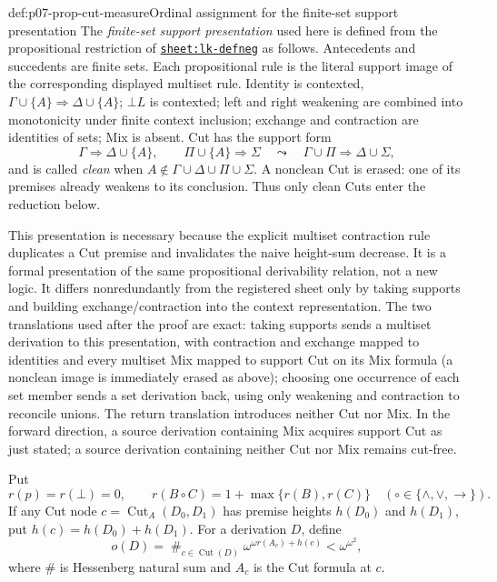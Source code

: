 \begin{hbdefinition}{def:p07-prop-cut-measure}{Ordinal assignment for the finite-set support presentation}
The \emph{finite-set support presentation} used here is defined from the
propositional restriction of
\hyperref[sheet:lk-defneg]{\texttt{sheet:lk-defneg}} as follows.  Antecedents
and succedents are finite sets.  Each propositional rule is the literal support
image of the corresponding displayed multiset rule.  Identity is contexted,
\(\Gamma\cup\{A\}\Rightarrow\Delta\cup\{A\}\); \(\bot L\) is contexted;
left and right weakening are combined into monotonicity under finite context
inclusion; exchange and contraction are identities of sets; Mix is absent.
Cut has the support form
\[
 \Gamma\Rightarrow\Delta\cup\{A\},\qquad
 \Pi\cup\{A\}\Rightarrow\Sigma
 \quad\leadsto\quad
 \Gamma\cup\Pi\Rightarrow\Delta\cup\Sigma,
\]
and is called \emph{clean} when
\(A\notin\Gamma\cup\Delta\cup\Pi\cup\Sigma\).  A nonclean Cut is erased:
one of its premises already weakens to its conclusion.  Thus only clean Cuts
enter the reduction below.

This presentation is necessary because the explicit multiset contraction rule
duplicates a Cut premise and invalidates the naive height-sum decrease.  It is
a formal presentation of the same propositional derivability relation, not a
new logic.  It differs nonredundantly from the registered sheet only by taking
supports and building exchange/contraction into the context representation.
The two translations used after the proof are exact: taking supports sends a
multiset derivation to this presentation, with contraction and exchange mapped
to identities and every multiset Mix mapped to support Cut on its Mix formula
(a nonclean image is immediately erased as above); choosing one occurrence of each set member sends a set
derivation back, using only weakening and contraction to reconcile unions.
The return translation introduces neither Cut nor Mix.  In the forward
direction, a source derivation containing Mix acquires support Cut as just
stated; a source derivation containing neither Cut nor Mix remains cut-free.

Put
\[
 r(p)=r(\bot)=0,
 \qquad
 r(B\mathbin\circ C)=1+\max\{r(B),r(C)\}
 \quad(\circ\in\{\land,\lor,\to\}).
\]
If any Cut node \(c=\operatorname{Cut}_A(D_0,D_1)\) has premise heights
\(h(D_0)\) and \(h(D_1)\), put
\(h(c)=h(D_0)+h(D_1)\).  For a derivation \(D\), define
\[
 o(D)=\mathop{\#}_{c\in\operatorname{Cut}(D)}
       \omega^{\omega r(A_c)+h(c)}<\omega^{\omega^2},
\]
where \(\#\) is Hessenberg natural sum and \(A_c\) is the Cut formula at
\(c\).


\end{hbdefinition}
